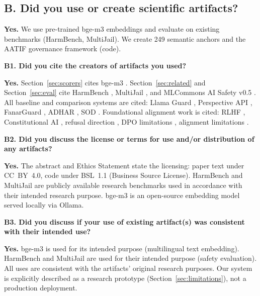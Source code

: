 
\subsection*{B. Did you use or create scientific artifacts?}

\textbf{Yes.} We use pre-trained bge-m3 embeddings \cite{chen2024bgem3} and evaluate on existing benchmarks (HarmBench, MultiJail). We create 249 semantic anchors and the AATIF governance framework (code).

\textbf{B1. Did you cite the creators of artifacts you used?}

\textbf{Yes.} Section~\ref{sec:scorers} cites bge-m3 \cite{chen2024bgem3}. Section~\ref{sec:related} and Section~\ref{sec:eval} cite HarmBench \cite{mazeika2024harmbench}, MultiJail \cite{deng2024multijail}, and MLCommons AI Safety v0.5 \cite{vidgen2024mlcommons}. All baseline and comparison systems are cited: Llama Guard \cite{inan2023llamaguard}, Perspective API \cite{lees2022perspective}, FanarGuard \cite{almuqhim2025fanarguard}, ADHAR \cite{alyafeai2024adhar}, SOD \cite{hussein2024sod}. Foundational alignment work is cited: RLHF \cite{christiano2017rlhf}, Constitutional AI \cite{bai2022constitutional}, refusal direction \cite{arditi2024refusal}, DPO limitations \cite{lee2024dpo}, alignment limitations \cite{wolf2024behavior}.

\textbf{B2. Did you discuss the license or terms for use and/or distribution of any artifacts?}

\textbf{Yes.} The abstract and Ethics Statement state the licensing: paper text under CC~BY~4.0, code under BSL~1.1 (Business Source License). HarmBench and MultiJail are publicly available research benchmarks used in accordance with their intended research purpose. bge-m3 is an open-source embedding model served locally via Ollama.

\textbf{B3. Did you discuss if your use of existing artifact(s) was consistent with their intended use?}

\textbf{Yes.} bge-m3 is used for its intended purpose (multilingual text embedding). HarmBench and MultiJail are used for their intended purpose (safety evaluation). All uses are consistent with the artifacts' original research purposes. Our system is explicitly described as a research prototype (Section~\ref{sec:limitations}), not a production deployment.

